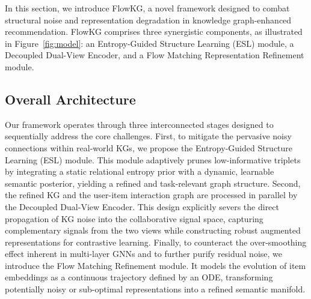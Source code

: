 




In this section, we introduce FlowKG, a novel framework designed to combat structural noise and representation degradation in knowledge graph-enhanced recommendation. FlowKG comprises three synergistic components, as illustrated in Figure~\ref{fig:model}: an Entropy-Guided Structure Learning (ESL) module, a Decoupled Dual-View Encoder, and a Flow Matching Representation Refinement module.

\subsection{Overall Architecture}
Our framework operates through three interconnected stages designed to sequentially address the core challenges.
First, to mitigate the pervasive noisy connections within real-world KGs, we propose the Entropy-Guided Structure Learning (ESL) module. This module adaptively prunes low-informative triplets by integrating a static relational entropy prior with a dynamic, learnable semantic posterior, yielding a refined and task-relevant graph structure.
Second, the refined KG and the user-item interaction graph are processed in parallel by the Decoupled Dual-View Encoder. This design explicitly severs the direct propagation of KG noise into the collaborative signal space, capturing complementary signals from the two views while constructing robust augmented representations for contrastive learning. Finally, to counteract the over-smoothing effect inherent in multi-layer GNNs and to further purify residual noise, we introduce the Flow Matching Refinement module. It models the evolution of item embeddings as a continuous trajectory defined by an ODE, transforming potentially noisy or sub-optimal representations into a refined semantic manifold.

